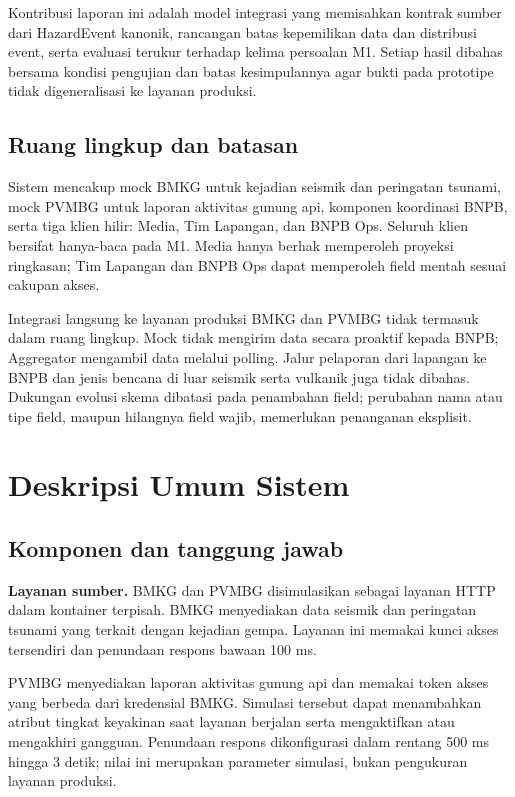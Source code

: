 \documentclass{fairmeta}
\begin{document}
Kontribusi laporan ini adalah model integrasi yang memisahkan kontrak sumber dari HazardEvent kanonik, rancangan batas kepemilikan data dan distribusi event, serta evaluasi terukur terhadap kelima persoalan M1. Setiap hasil dibahas bersama kondisi pengujian dan batas kesimpulannya agar bukti pada prototipe tidak digeneralisasi ke layanan produksi.

\subsection{Ruang lingkup dan batasan}

Sistem mencakup mock BMKG untuk kejadian seismik dan peringatan tsunami, mock PVMBG untuk laporan aktivitas gunung api, komponen koordinasi BNPB, serta tiga klien hilir: Media, Tim Lapangan, dan BNPB Ops. Seluruh klien bersifat hanya-baca pada M1. Media hanya berhak memperoleh proyeksi ringkasan; Tim Lapangan dan BNPB Ops dapat memperoleh field mentah sesuai cakupan akses.

Integrasi langsung ke layanan produksi BMKG dan PVMBG tidak termasuk dalam ruang lingkup. Mock tidak mengirim data secara proaktif kepada BNPB; Aggregator mengambil data melalui polling. Jalur pelaporan dari lapangan ke BNPB dan jenis bencana di luar seismik serta vulkanik juga tidak dibahas. Dukungan evolusi skema dibatasi pada penambahan field; perubahan nama atau tipe field, maupun hilangnya field wajib, memerlukan penanganan eksplisit.

\section{Deskripsi Umum Sistem}

\subsection{Komponen dan tanggung jawab}


\textbf{Layanan sumber.} BMKG dan PVMBG disimulasikan sebagai layanan HTTP dalam kontainer terpisah. BMKG menyediakan data seismik dan peringatan tsunami yang terkait dengan kejadian gempa. Layanan ini memakai kunci akses tersendiri dan penundaan respons bawaan 100 ms.

PVMBG menyediakan laporan aktivitas gunung api dan memakai token akses yang berbeda dari kredensial BMKG. Simulasi tersebut dapat menambahkan atribut tingkat keyakinan saat layanan berjalan serta mengaktifkan atau mengakhiri gangguan. Penundaan respons dikonfigurasi dalam rentang 500 ms hingga 3 detik; nilai ini merupakan parameter simulasi, bukan pengukuran layanan produksi.
\end{document}
